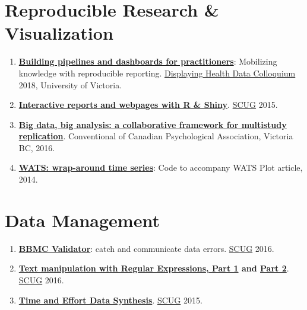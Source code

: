 \documentclass[]{book}
\providecommand{\tightlist}{%
  \setlength{\itemsep}{0pt}\setlength{\parskip}{0pt}}
\begin{document}
\hypertarget{reproducible-research-visualization}{%
\section{Reproducible Research \& Visualization}\label{reproducible-research-visualization}}

\begin{enumerate}
\def\labelenumi{\arabic{enumi}.}
\tightlist
\item
  \textbf{\href{https://github.com/dss-ialh/displaying-health-data/blob/master/documentation/products/beasley/dhd-2018-uvic-3-a-beasley-2018-11-29.pdf}{Building pipelines and dashboards for practitioners}}: Mobilizing knowledge with reproducible reporting. \href{https://github.com/dss-ialh/displaying-health-data}{Displaying Health Data Colloquium} 2018, University of Victoria.
\item
  \textbf{\href{https://rawgit.com/OuhscBbmc/StatisticalComputing/master/2015_Presentations/10_October/beasley-scug-shiny-2015-10.html\#/}{Interactive reports and webpages with R \& Shiny}}. \href{https://github.com/OuhscBbmc/StatisticalComputing}{SCUG} 2015.
\item
  \textbf{\href{https://github.com/IALSA/IALSA-2015-Portland/blob/master/pubs/2016-talks/2016-06-09-cpa/ppt/koval-etal-2016-06-10-cpa.pdf}{Big data, big analysis: a collaborative framework for multistudy replication}}. Conventional of Canadian Psychological Association, Victoria BC, 2016.
\item
  \textbf{\href{https://github.com/OuhscBbmc/Wats}{WATS: wrap-around time series}}: Code to accompany WATS Plot article, 2014.
\end{enumerate}

\hypertarget{data-management}{%
\section{Data Management}\label{data-management}}

\begin{enumerate}
\def\labelenumi{\arabic{enumi}.}
\tightlist
\item
  \textbf{\href{https://rawgit.com/OuhscBbmc/StatisticalComputing/master/2016-presentations/11-november/beasley-scug-validator-2016-11.html\#/}{BBMC Validator}}: catch and communicate data errors. \href{https://github.com/OuhscBbmc/StatisticalComputing}{SCUG} 2016.
\item
  \textbf{\href{https://rawgit.com/OuhscBbmc/StatisticalComputing/master/2016-presentations/02-february/beasley-scug-regex-part-1-2016-02.html}{Text manipulation with Regular Expressions, Part 1} and \href{https://rawgit.com/OuhscBbmc/StatisticalComputing/master/2016-presentations/05-may/beasley-scug-regex-part-2-2016-05.html\#/}{Part 2}}. \href{https://github.com/OuhscBbmc/StatisticalComputing}{SCUG} 2016.
\item
  \textbf{\href{https://rawgit.com/wibeasley/RAnalysisSkeleton/master/documentation/time-and-effort-synthesis.html\#/}{Time and Effort Data Synthesis}}. \href{https://github.com/OuhscBbmc/StatisticalComputing}{SCUG} 2015.
\end{enumerate}
\end{document}
